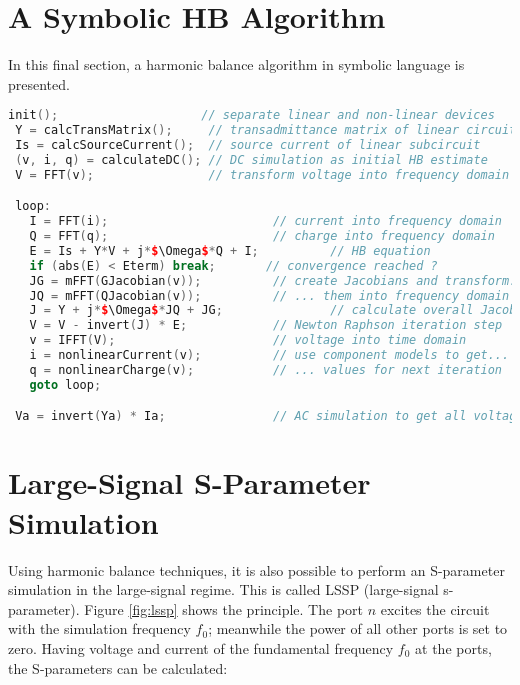 \section{A Symbolic HB Algorithm}

In this final section, a harmonic balance algorithm in symbolic language is
presented.

\addvspace{12pt}

\begin{lstlisting}[language=C++,
    caption={symbolic HB algorithm},
    basicstyle=\small,
    frame=single,
    mathescape=true,
    fontadjust]
 init();                    // separate linear and non-linear devices
 Y = calcTransMatrix();     // transadmittance matrix of linear circuit
 Is = calcSourceCurrent();  // source current of linear subcircuit
 (v, i, q) = calculateDC(); // DC simulation as initial HB estimate
 V = FFT(v);                // transform voltage into frequency domain

 loop:
   I = FFT(i);                       // current into frequency domain
   Q = FFT(q);                       // charge into frequency domain
   E = Is + Y*V + j*$\Omega$*Q + I;          // HB equation
   if (abs(E) < Eterm) break;       // convergence reached ?
   JG = mFFT(GJacobian(v));          // create Jacobians and transform...
   JQ = mFFT(QJacobian(v));          // ... them into frequency domain
   J = Y + j*$\Omega$*JQ + JG;               // calculate overall Jacobian
   V = V - invert(J) * E;            // Newton Raphson iteration step
   v = IFFT(V);                      // voltage into time domain
   i = nonlinearCurrent(v);          // use component models to get...
   q = nonlinearCharge(v);           // ... values for next iteration
   goto loop;

 Va = invert(Ya) * Ia;               // AC simulation to get all voltages
\end{lstlisting}

\section{Large-Signal S-Parameter Simulation}

Using harmonic balance techniques, it is also possible to perform
an S-parameter simulation in the large-signal regime. This is called
LSSP (large-signal s-parameter). Figure \ref{fig:lssp} shows the
principle. The port $n$ excites the circuit with the simulation
frequency $f_0$; meanwhile the power of all other ports is set to
zero. Having voltage and current of the fundamental frequency $f_0$
at the ports, the S-parameters can be calculated:


